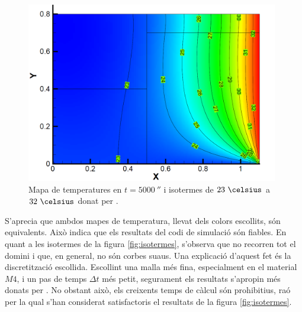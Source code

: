 \begin{figure}[h]
	\centering
	\includegraphics[width=11cm]{imagenes/03_validacio/isotermes_cttc.PNG}
	\caption{Mapa de temperatures en $t = 5000 \ \second$ i isotermes de $23 \ \celsius$ a $32 \ \celsius$ donat per \cite{cttc}.}
	\label{fig:isotermes_cttc}
\end{figure}

S'aprecia que ambdos mapes de temperatura, llevat dels colors escollits, són equivalents. Això indica que els resultats del codi de simulació són fiables. En quant a les isotermes de la figura \ref{fig:isotermes}, s'observa que no recorren tot el domini i que, en general, no són corbes suaus. Una explicació d'aquest fet és la discretització escollida. Escollint una malla més fina, especialment en el material $M4$, i un pas de temps $\Delta t$ més petit, segurament els resultats s'apropin més donats per \cite{cttc}. No obstant això, els creixents temps de càlcul són prohibitius, raó per la qual s'han considerat satisfactoris el resultats de la figura \ref{fig:isotermes}.


